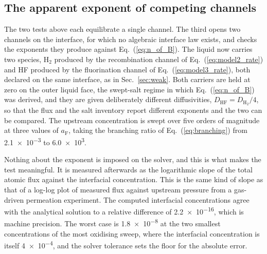 \documentclass[5p]{elsarticle}
\begin{document}
\subsection{The apparent exponent of competing channels}
\label{sec:exponent_verification}

The two tests above each equilibrate a single channel.
The third opens two channels on the interface, for which no algebraic interface law exists, and checks the exponents they produce against Eq.~(\ref{eq:n_of_B}).
The liquid now carries two species, $\mathrm{H_2}$ produced by the recombination channel of Eq.~(\ref{eq:model2_rate}) and HF produced by the fluorination channel of Eq.~(\ref{eq:model3_rate}), both declared on the same interface, as in Sec.~\ref{sec:weak}.
Both carriers are held at zero on the outer liquid face, the swept-salt regime in which Eq.~(\ref{eq:n_of_B}) was derived, and they are given deliberately different diffusivities, $D_\mathrm{HF} = D_\mathrm{H_2}/4$, so that the flux and the salt inventory report different exponents and the two can be compared.
The upstream concentration is swept over five orders of magnitude at three values of $a_\mathrm{F}$, taking the branching ratio of Eq.~(\ref{eq:branching}) from \num{2.1e-3} to \num{6.0e3}.

Nothing about the exponent is imposed on the solver, and this is what makes the test meaningful. 
It is measured afterwards as the logarithmic slope of the total atomic flux against the interfacial concentration. 
This is the same kind of slope as that of a log-log plot of measured flux against upstream pressure from a gas-driven permeation experiment.
The computed interfacial concentrations agree with the analytical solution to a relative difference of \num{2.2e-16}, which is machine precision.
The worst case is \num{1.8e-8} at the two smallest concentrations of the most oxidising sweep, where the interfacial concentration is itself \num{4e-4}, and the solver tolerance sets the floor for the absolute error.
\end{document}
